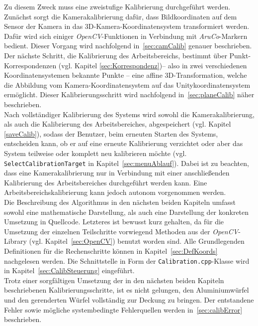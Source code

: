 Zu diesem Zweck muss eine zweistufige Kalibrierung durchgeführt werden. Zunächst sorgt die Kamerakalibrierung dafür, dass Bildkoordinaten auf dem Sensor der Kamera in das 3D-Kamera-Koordinatensystem transformiert werden. Dafür wird sich einiger \textit{OpenCV}-Funktionen in Verbindung mit \textit{AruCo}-Markern bedient. Dieser Vorgang wird nachfolgend in~\ref{sec:camCalib} genauer beschrieben.\\
Der nächste Schritt, die Kalibrierung des Arbeitsbereichs, bestimmt über Punkt-Korrespondenzen (vgl. Kapitel \ref{sec:Korrespondenz})-- also in zwei verschiedenen Koordinatensystemen bekannte Punkte -- eine affine 3D-Transformation, welche die Abbildung vom Kamera-Koordinaten\-system auf das Unitykoordinatensystem ermöglicht. Dieser Kalibrierungsschritt wird nachfolgend in~\ref{sec:planeCalib} näher beschrieben.\\
Nach vollständiger Kalibrierung des Systems wird sowohl die Kamerakalibrierung, als auch die Kalibrierung des Arbeitsbereiches, abgespeichert (vgl. Kapitel \ref{saveCalib}), sodass der Benutzer, beim erneuten Starten des Systems, entscheiden kann, ob er auf eine erneute Kalibrierung verzichtet oder aber das System teilweise oder komplett neu kalibrieren möchte (vgl. \texttt{SelectCalibrationTarget} in Kapitel~\ref{sec:menuAblauf}). Dabei ist zu beachten, dass eine Kamerakalibrierung nur in Verbindung mit einer anschließenden Kalibrierung des Arbeitsbereiches durchgeführt werden kann. Eine Arbeitsbereichskalibrierung kann jedoch autonom vorgenommen werden. \\
Die Beschreibung des Algorithmus in den nächsten beiden Kapiteln umfasst sowohl eine mathematische Darstellung, als auch eine Darstellung der konkreten Umsetzung in Quellcode. Letzteres ist bewusst kurz gehalten, da für die Umsetzung der einzelnen Teilschritte vorwiegend Methoden aus der \textit{OpenCV}-Library (vgl. Kapitel~\ref{sec:OpenCV}) benutzt worden sind. Alle Grundlegenden Definitionen für die Rechenschritte können in Kapitel~\ref{sec:DefKoords} nachgelesen werden. Die Schnittstelle in Form der \texttt{Calibration.cpp}-Klasse wird in Kapitel~\ref{sec:CalibSteuerung} eingeführt.\\
Trotz einer sorgfältigen Umsetzung der in den nächsten beiden Kapiteln beschriebenen Kalibrierungsschritte, ist es nicht gelungen, den Aluminiumwürfel und den gerenderten Würfel vollständig zur Deckung zu bringen. Der entstandene Fehler sowie mögliche systembedingte Fehlerquellen werden in~\ref{sec:calibError} beschrieben. 

